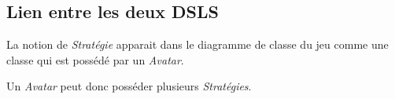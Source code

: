 
\subsection{Lien entre les deux DSLS}
\label{sec:question-5}

La notion de \emph{Stratégie} apparait dans le diagramme de classe du jeu comme une classe qui est possédé par un \emph{Avatar}.

Un \emph{Avatar} peut donc posséder plusieurs \emph{Stratégies}.